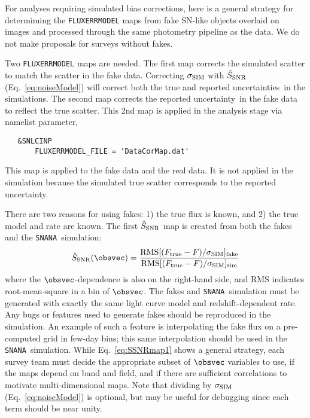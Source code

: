 \documentclass[12pt]{article}
\newcommand{\unc}{uncertainty}
\newcommand{\uncs}{uncertainties}
\newcommand{\snana}{{\tt SNANA}}
\newcommand{\sigSIM}{\sigma_{\rm SIM}}
\newcommand{\SSNR}{\hat{S}_{\rm SNR}}
\begin{document}
{For analyses requiring simulated bias corrections,
here is a general strategy for determiming the {\tt FLUXERRMODEL} 
maps from fake SN-like objects overlaid on images and processed 
through the same photometry pipeline as the data. 
We do not make proposals for surveys without fakes.

Two {\tt FLUXERRMODEL} maps are needed.
The first map corrects the simulated scatter to match the
scatter in the fake data. 
Correcting $\sigSIM$ with $\SSNR$ (Eq.~\ref{eq:noiseModel}) will correct
both the true and reported \uncs\ in the simulations.
The second map corrects the reported \unc\ in the fake data
to reflect the true scatter. This 2nd map is applied in the
analysis stage via namelist parameter,
\begin{verbatim}
   &SNLCINP
       FLUXERRMODEL_FILE = 'DataCorMap.dat'
\end{verbatim}
%
This map is applied to the fake data and the real data.
It is not applied in the simulation because the simulated
true scatter corresponds to the reported \unc.

\newcommand{\Ftrue}{F_{\rm true}}

There are two reasons for using fakes: 
1) the true flux is known, and 2) the true model and rate are known.
The first $\SSNR$ map is created from both the fakes and the 
\snana\ simulation:
\begin{equation}
  \SSNR(\obsvec) = 
       \frac{ {\rm RMS}[(\Ftrue-F)/\sigSIM ]_{\rm fake} }
            { {\rm RMS}[(\Ftrue-F)/\sigSIM ]_{\rm sim} }
   \label{eq:SSNRmap1}
\end{equation}
%
where the $\obsvec$-dependence is also on the right-hand side,
and RMS indicates root-mean-square in a bin of $\obsvec$.
The fakes and \snana\ simulation  must be generated
with exactly the same light curve model and redshift-dependent rate.
Any bugs or features used to generate fakes should be reproduced 
in the simulation. An example of such a feature is interpolating
the fake flux on a pre-computed grid in few-day bins; this same
interpolation should be used in the \snana\ simulation.
While Eq.~\ref{eq:SSNRmap1} shows a general strategy, each survey
team must decide 
the appropriate subset of $\obsvec$ variables to use,
if the maps depend on band and field, and
if there are sufficient correlations to motivate multi-dimensional maps.
Note that dividing by $\sigSIM$ (Eq.~\ref{eq:noiseModel}) is optional, 
but may be useful for debugging since each term should be near unity.

\newcommand{\sigPIPE}{\sigma_{\rm PhotPipe}}

}
\end{document}
